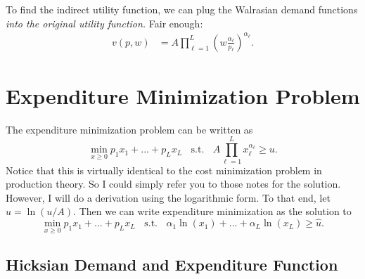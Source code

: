 \documentclass[12pt]{article}
\theoremstyle{definition}
\begin{document}
To find the indirect utility function, we can plug the Walrasian demand functions \emph{into the original utility function.} Fair enough:
\begin{align*}
	v(p,w) &=  A \prod_{\ell=1}^L \left(w \frac{\alpha_{\ell}}{p_{\ell}}\right)^{\alpha_{\ell}}.
\end{align*}
	
	

\section{Expenditure Minimization Problem}

The expenditure minimization problem can be written as
	\[\min_{x \geq 0} p_1x_1 + ... + p_Lx_L \;\; \text{ s.t. } \;\; 	A \prod_{{\ell}=1}^L x_{\ell}^{\alpha_{\ell}} \geq u. \]
Notice that this is virtually identical to the cost minimization problem in production theory. So I could simply refer you to those notes for the solution. However, I will do a derivation using the logarithmic form. To that end, let $\hat{u}=\ln(u/A)$. Then we can write expenditure minimization as the solution to
	\[\min_{x \geq 0} p_1x_1 + ... + p_Lx_L \;\; \text{ s.t. } \;\; \alpha_1 \ln(x_1) + ... + \alpha_L \ln(x_L) \geq \hat{u}. \]

	
\subsection{Hicksian Demand and Expenditure Function}
\end{document}
